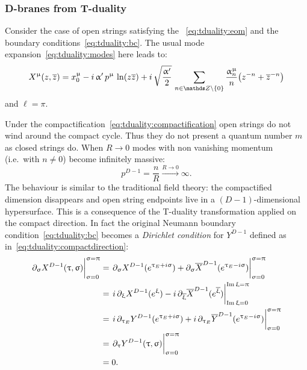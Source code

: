 \subsubsection{D-branes from T-duality}

Consider the case of open strings satisfying the \eom~\eqref{eq:tduality:eom} and the boundary conditions~\eqref{eq:tduality:bc}.
The usual mode expansion~\eqref{eq:tduality:modes} here leads to:
\begin{equation}
  X^{\mu}( z, \barz )
  =
  x_0^{\mu}
  -
  i\, \ap\, p^{\mu}\, \ln( z \barz )
  +
  i\, \sqrt{\frac{\ap}{2}}\,
  \sum\limits_{n \in \Z \setminus \{0\}}
  \frac{\alpha_n^{\mu}}{n} \qty( z^{-n} + \barz^{-n} )
\end{equation}
and $\ell = \pi$.

Under the compactification~\eqref{eq:tduality:compactification} open strings do not wind around the compact cycle.
Thus they do not present a quantum number $m$ as closed strings do.
When $R \to 0$ modes with non vanishing momentum (i.e.\ with $n \neq 0$) become infinitely massive:
\begin{equation}
  p^{D-1}
  =
  \frac{n}{R} \stackrel{R \to 0}{\longrightarrow} \infty.
\end{equation}
The behaviour is similar to the traditional field theory: the compactified dimension disappears and open string endpoints live in a $(D-1)$-dimensional hypersurface.
This is a consequence of the T-duality transformation applied on the compact direction.
In fact the original Neumann boundary condition~\eqref{eq:tduality:bc} becomes a \emph{Dirichlet condition} for $Y^{D-1}$ defined as in~\eqref{eq:tduality:compactdirection}:
\begin{equation}
  \begin{split}
    \eval{\ipd{\sigma} X^{D-1}( \tau, \sigma )}^{\sigma = \pi}_{\sigma = 0}
    & =
    \eval{\ipd{\sigma} X^{D-1}( e^{\tau_E + i \sigma} ) + \ipd{\sigma} \barX^{D-1}( e^{\tau_E - i \sigma} )}^{\sigma = \pi}_{\sigma = 0}
    \\
    & =
    \eval{i\, \ipd{\xi} X^{D-1}( e^{\xi} ) - i\, \ipd{\bxi} \barX^{D-1}( e^{\bxi} )}^{\Im \xi = \pi}_{\Im \xi = 0}
    \\
    & =
    \eval{i\, \ipd{\tau_E} Y^{D-1}( e^{\tau_E + i \sigma} ) + i\, \ipd{\tau_E} \barY^{D-1}( e^{\tau_E - i \sigma} )}^{\sigma = \pi}_{\sigma = 0}
    \\
    & =
    \eval{\ipd{\tau} Y^{D-1}( \tau, \sigma )}^{\sigma = \pi}_{\sigma = 0}
    \\
    & =
    0.
  \end{split}
\end{equation}
